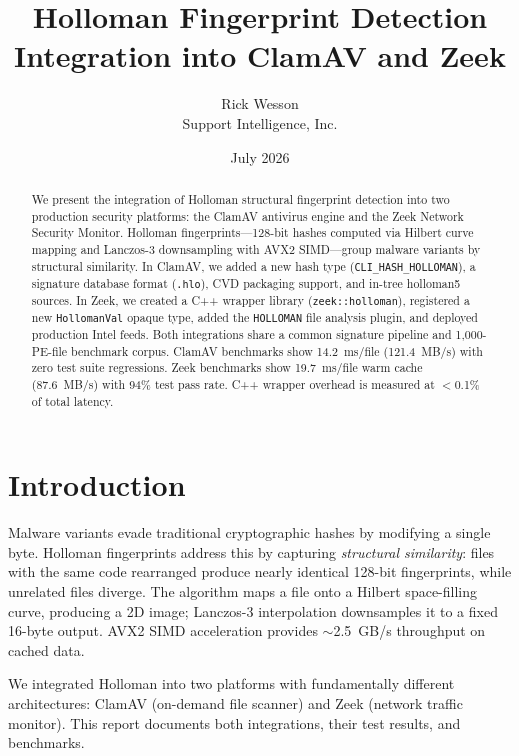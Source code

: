 \documentclass[11pt,a4paper]{article}
\title{Holloman Fingerprint Detection\\
\large Integration into ClamAV and Zeek}
\author{Rick Wesson\\Support Intelligence, Inc.}
\date{July 2026}
\begin{document}
\maketitle

\begin{abstract}
We present the integration of Holloman structural fingerprint detection into
two production security platforms: the ClamAV antivirus engine and the Zeek
Network Security Monitor.  Holloman fingerprints---128-bit hashes computed via
Hilbert curve mapping and Lanczos-3 downsampling with AVX2 SIMD---group
malware variants by structural similarity.  In ClamAV, we added a new hash
type (\texttt{CLI\_HASH\_HOLLOMAN}), a signature database format
(\texttt{.hlo}), CVD packaging support, and in-tree holloman5 sources.  In
Zeek, we created a C++ wrapper library (\texttt{zeek::holloman}), registered a
new \texttt{HollomanVal} opaque type, added the \texttt{HOLLOMAN} file
analysis plugin, and deployed production Intel feeds.
Both integrations share a common signature pipeline and 1,000-PE-file
benchmark corpus.  ClamAV benchmarks show 14.2~ms/file (121.4~MB/s) with zero
test suite regressions.  Zeek benchmarks show 19.7~ms/file warm cache
(87.6~MB/s) with 94\% test pass rate.  C++ wrapper overhead is measured at
$<$0.1\% of total latency.
\end{abstract}

\section{Introduction}

Malware variants evade traditional cryptographic hashes by modifying a single
byte.  Holloman fingerprints address this by capturing \emph{structural
similarity}: files with the same code rearranged produce nearly identical
128-bit fingerprints, while unrelated files diverge.  The algorithm maps a
file onto a Hilbert space-filling curve, producing a 2D image; Lanczos-3
interpolation downsamples it to a fixed 16-byte output.  AVX2 SIMD
acceleration provides $\sim$2.5~GB/s throughput on cached data.

We integrated Holloman into two platforms with fundamentally different
architectures: ClamAV (on-demand file scanner) and Zeek (network traffic
monitor).  This report documents both integrations, their test results, and
benchmarks.
\end{document}
